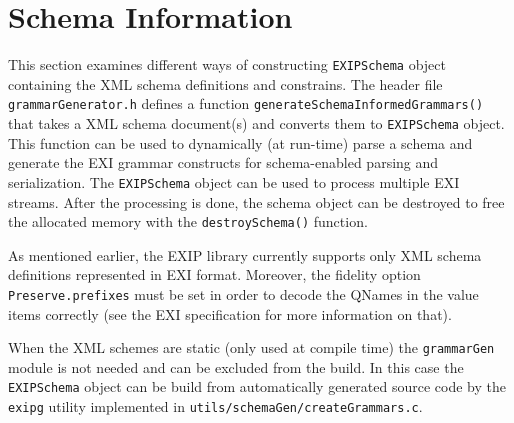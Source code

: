 \section{Schema Information}
\label{sec:Schema-Infromation}

This section examines different ways of constructing \texttt{EXIPSchema} object
containing the XML schema definitions and constrains. The header file \texttt{grammarGenerator.h}
defines a function \texttt{generateSchemaInformedGrammars()} that takes a XML schema document(s) and converts them to
\texttt{EXIPSchema} object. This function can be used to dynamically (at run-time)
parse a schema and generate the EXI grammar constructs for schema-enabled
parsing and serialization. The \texttt{EXIPSchema} object can be used to process
multiple EXI streams. After the processing is done, the schema object can be destroyed
to free the allocated memory with the \texttt{destroySchema()} function.

As mentioned earlier, the EXIP library currently supports
only XML schema definitions represented in EXI format. Moreover, the fidelity option \texttt{Preserve.prefixes} must be
set in order to decode the QNames in the value items correctly (see the EXI specification for
more information on that).

When the XML schemes are static (only used at
compile time) the \texttt{grammarGen} module is not needed and can be excluded from the build.
In this case the \texttt{EXIPSchema} object can be build from automatically generated source code
by the \texttt{exipg} utility implemented in \texttt{utils/schemaGen/createGrammars.c}.

